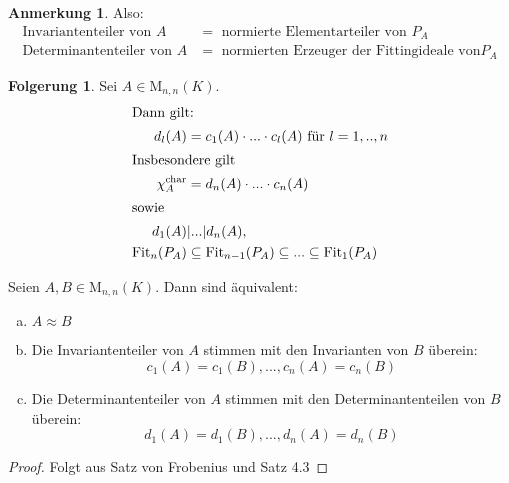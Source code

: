 \documentclass[a4paper, titlepage]{article}
\theoremstyle{definition}
\newtheorem{Folgerung}[satz]{Folgerung}
\newtheorem*{anm}{Anmerkung}
\newcommand{\Fit}{\mathrm{Fit}}
\newcommand{\M}{\mathrm{M}}
\begin{document}
\begin{anm}
    Also: \begin{align*}
        \text{Invariantenteiler von }A&=\text{ normierte Elementarteiler von }P_A\\
        \text{Determinantenteiler von }A&= \text{ normierten Erzeuger der Fittingideale von} P_A
    \end{align*}
\end{anm}
\begin{Folgerung} Sei $A\in \M_{n,n}(K).$ 
    \begin{align*}
        \intertext{Dann gilt:}
        d_l(A)&=c_1(A)\cdot...\cdot c_l(A) \text{ für } l=1,..,n\\
        \intertext{Insbesondere gilt }
        \chi_{A}^{\text{char}}&= d_n(A)\cdot ... \cdot c_n(A)\\
        \intertext{sowie}
        d_1(A)&|...|d_n(A),\\
        \Fit_n(P_A)&\subseteq \Fit_{n-1}(P_A)\subseteq ... \subseteq \Fit_1(P_A)
    \end{align*}
\end{Folgerung}
\begin{satz}[Invariantenteilersatz]
    Seien $A,B\in\M_{n,n}(K).$ Dann sind äquivalent:
    \begin{enumerate}[(a)]
        \item $A\approx B$ 
        \item Die Invariantenteiler von $A$ stimmen mit den Invarianten von $B$ überein: 
            $$c_1(A)=c_1(B),...,c_n(A)=c_n(B)$$
        \item Die Determinantenteiler von $A$ stimmen mit den Determinantenteilen von $B$ überein: 
            $$ d_1(A)=d_1(B),...,d_n(A)=d_n(B)$$
    \end{enumerate}
\end{satz}
\begin{proof}
    Folgt aus Satz von Frobenius und Satz 4.3 
\end{proof}
\end{document}
